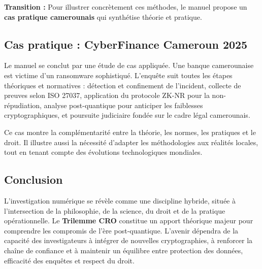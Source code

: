 \documentclass[memoire, 12pt]{report}
\begin{document}
\textbf{Transition :} Pour illustrer concrètement ces méthodes, 
le manuel propose un \textbf{cas pratique camerounais} qui synthétise théorie et pratique.  

 

\subsection*{Cas pratique : CyberFinance Cameroun 2025}
Le manuel se conclut par une étude de cas appliquée.  
Une banque camerounaise est victime d’un ransomware sophistiqué.  
L’enquête suit toutes les étapes théoriques et normatives : 
détection et confinement de l’incident, collecte de preuves selon ISO 27037, 
application du protocole ZK-NR pour la non-répudiation, 
analyse post-quantique pour anticiper les faiblesses cryptographiques, 
et poursuite judiciaire fondée sur le cadre légal camerounais.  

Ce cas montre la complémentarité entre la théorie, les normes, les pratiques et le droit.  
Il illustre aussi la nécessité d’adapter les méthodologies aux réalités locales, 
tout en tenant compte des évolutions technologiques mondiales.  

\subsection*{Conclusion}
L’investigation numérique se révèle comme une discipline hybride, 
située à l’intersection de la philosophie, de la science, du droit et de la pratique opérationnelle.  
Le \textbf{Trilemme CRO} constitue un apport théorique majeur pour comprendre 
les compromis de l’ère post-quantique.  
L’avenir dépendra de la capacité des investigateurs à intégrer de nouvelles cryptographies, 
à renforcer la chaîne de confiance et à maintenir un équilibre 
entre protection des données, efficacité des enquêtes et respect du droit.  
\end{document}

